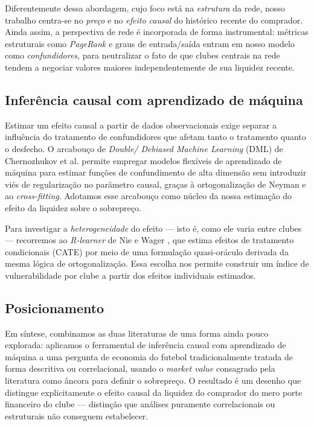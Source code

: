 Diferentemente dessa abordagem, cujo foco está na \textit{estrutura} da rede, nosso trabalho
centra-se no \textit{preço} e no \textit{efeito causal} do histórico recente do comprador. Ainda
assim, a perspectiva de rede é incorporada de forma instrumental: métricas estruturais como
\textit{PageRank} e graus de entrada/saída entram em nosso modelo como \textit{confundidores}, para
neutralizar o fato de que clubes centrais na rede tendem a negociar valores maiores
independentemente de sua liquidez recente.

\subsection{Inferência causal com aprendizado de máquina}

Estimar um efeito causal a partir de dados observacionais exige separar a influência do tratamento
de confundidores que afetam tanto o tratamento quanto o desfecho. O arcabouço de \textit{Double/
Debiased Machine Learning} (DML) de Chernozhukov et al. \cite{chernozhukov2018} permite empregar modelos flexíveis
de aprendizado de máquina para estimar funções de confundimento de alta dimensão sem introduzir viés
de regularização no parâmetro causal, graças à ortogonalização de Neyman e ao \textit{cross-fitting}.
Adotamos esse arcabouço como núcleo da nossa estimação do efeito da liquidez sobre o sobrepreço.

Para investigar a \textit{heterogeneidade} do efeito — isto é, como ele varia entre clubes —
recorremos ao \textit{R-learner} de Nie e Wager \cite{nie2021}, que estima efeitos de tratamento
condicionais (CATE) por meio de uma formulação quasi-oráculo derivada da mesma lógica de
ortogonalização. Essa escolha nos permite construir um índice de vulnerabilidade por clube a partir
dos efeitos individuais estimados.

\subsection{Posicionamento}

Em síntese, combinamos as duas literaturas de uma forma ainda pouco explorada: aplicamos o
ferramental de inferência causal com aprendizado de máquina \cite{chernozhukov2018,nie2021} a uma
pergunta de economia do futebol tradicionalmente tratada de forma descritiva ou correlacional,
usando o \textit{market value} consagrado pela literatura \cite{peeters2018} como âncora para
definir o sobrepreço. O resultado é um desenho que distingue explicitamente o efeito causal da
liquidez do comprador do mero porte financeiro do clube — distinção que análises puramente
correlacionais ou estruturais não conseguem estabelecer.
